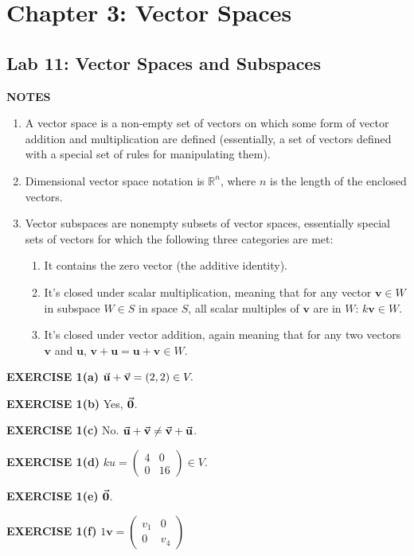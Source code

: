 \documentclass[12pt]{article}
\newcommand{\mat}[1]{\mathbf{#1}}
\newcommand{\exercise}[1]{\textbf{EXERCISE #1}\label{#1}}
\newcommand{\notes}{\textbf{NOTES}}
\begin{document}
\section{Chapter 3: Vector Spaces}

\subsection{Lab 11: Vector Spaces and Subspaces}

\notes

\begin{enumerate}
\item A vector space is a non-empty set of vectors on which some form of vector addition and multiplication are defined (essentially, a set of vectors defined with a special set of rules for manipulating them). 
\item Dimensional vector space notation is $\mathbb{R}^{n}$, where $n$ is the length of the enclosed vectors.
\item Vector subspaces are nonempty subsets of vector spaces, essentially special sets of vectors for which the following three categories are met:
\begin{enumerate}
\item It contains the zero vector (the additive identity).
\item It's closed under scalar multiplication, meaning that for any vector $\mat{v} \in W$ in subspace $W \in S$ in space $S$, all scalar multiples of $\mat{v}$ are in $W$: $k\mat{v} \in W$.
\item It's closed under vector addition, again meaning that for any two vectors $\mat{v}$ and $\mat{u}$, $\mat{v} + \mat{u} = \mat{u} + \mat{v} \in W$. 
\end{enumerate}
\end{enumerate}

\exercise{1(a)} $\va{u} + \va{v} = (2,2) \in V.$

\exercise{1(b)} Yes, $\va{0}$.

\exercise{1(c)} No. $\va{u} + \va{v} \ne \va{v} + \va{u}$.

\exercise{1(d)} $ku = \begin{pmatrix} 4 & 0 \\ 0 & 16 \end{pmatrix} \in V$.

\exercise{1(e)} $\va{0}$.

\exercise{1(f)} $1\mat{v} = \begin{pmatrix} v_{1} & 0 \\ 0 & v_{4} \end{pmatrix}$
\end{document}
